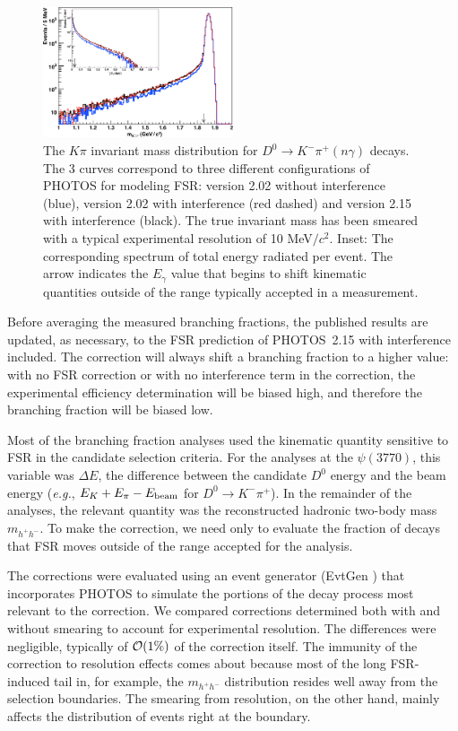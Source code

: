 \begin{figure}[bt]
\begin{center}
\includegraphics[width=0.5\textwidth,angle=0.]{figures/charm/FSR_mkpi.pdf}
\caption{The $K\pi$ invariant mass distribution for 
$D^0\to K^-\pi^+ (n\gamma)$ decays. The 3 curves correspond 
to three different configurations of PHOTOS for modeling FSR: 
version 2.02 without interference (blue), version 2.02 with 
interference (red dashed) and version 2.15 with interference (black).  
The true invariant mass has been smeared with a typical experimental 
resolution of 10 MeV${}/c^2$.  Inset: The corresponding spectrum of 
total energy radiated per event.  The arrow indicates the $E_\gamma$ 
value that begins to shift kinematic quantities outside of the range 
typically accepted in a measurement.}
\label{fig:FSR_mass_shift}
\end{center}
\end{figure}

Before averaging the measured branching fractions, the published 
results are updated, as necessary, to the FSR prediction of 
PHOTOS~2.15 with interference included.  The correction will 
always shift a branching fraction to a higher value: with no 
FSR correction or with no interference term in the correction, 
the experimental efficiency determination will be biased high, 
and therefore the branching fraction will be biased low.

Most of the branching fraction analyses used the kinematic quantity 
sensitive to FSR in the candidate selection criteria.  For the 
analyses at the $\psi(3770)$, this variable was $\Delta E$, the 
difference between the candidate $D^0$ energy and the beam energy 
({\em e.g.}, $E_K + E_\pi - E_{\rm beam}$ for $D^0\to K^-\pi^+$).  
In the remainder of the analyses, the relevant quantity was the 
reconstructed hadronic two-body mass $m_{h^+h^-}$.  To make the correction, 
we need only to evaluate the fraction of decays that FSR moves 
outside of the range accepted for the analysis.  

The corrections were evaluated using an event generator (EvtGen 
\cite{Ryd:2005zz}) that incorporates PHOTOS to simulate the 
portions of the decay process most relevant to the correction.  
We compared corrections determined both with and without smearing 
to account for experimental resolution.  The differences were 
negligible, typically of ${\cal O}(1\%)$ of the correction itself.  
The immunity of the correction to resolution effects comes about because 
most of the long FSR-induced tail in, for example, the $m_{h^+h^-}$ 
distribution resides well away from the selection boundaries.  The 
smearing from resolution, on the other hand, mainly affects the 
distribution of events right at the boundary.

